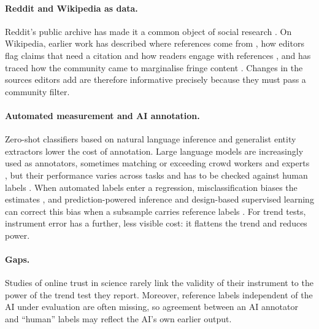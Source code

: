 \documentclass[10pt,a4paper]{article}
\begin{document}
\paragraph{Reddit and Wikipedia as data.}
Reddit's public archive has made it a common object of social research \cite{proferes2021}.
On Wikipedia, earlier work has described where references come from \cite{ford2013}, how
editors flag claims that need a citation \cite{redi2019} and how readers engage with
references \cite{piccardi2020}, and has traced how the community came to marginalise fringe
content \cite{steinsson2024}. Changes in the sources editors add are therefore informative
precisely because they must pass a community filter.

\paragraph{Automated measurement and AI annotation.}
Zero-shot classifiers based on natural language inference \cite{laurer2024} and generalist
entity extractors \cite{zaratiana2024} lower the cost of annotation. Large language models are
increasingly used as annotators, sometimes matching or exceeding crowd workers and experts
\cite{gilardi2023,tornberg2023}, but their performance varies across tasks and has to be
checked against human labels \cite{ziems2024,pangakis2023}. When automated labels enter a
regression, misclassification biases the estimates \cite{fong2021,teblunthuis2024}, and
prediction-powered inference and design-based supervised learning can correct this bias when
a subsample carries reference labels \cite{angelopoulos2023,egami2023}. For trend tests,
instrument error has a further, less visible cost: it flattens the trend and reduces power.

\paragraph{Gaps.}
Studies of online trust in science rarely link the validity of their instrument to the power
of the trend test they report. Moreover, reference labels independent of the AI under
evaluation are often missing, so agreement between an AI annotator and ``human'' labels may
reflect the AI's own earlier output.
\end{document}
